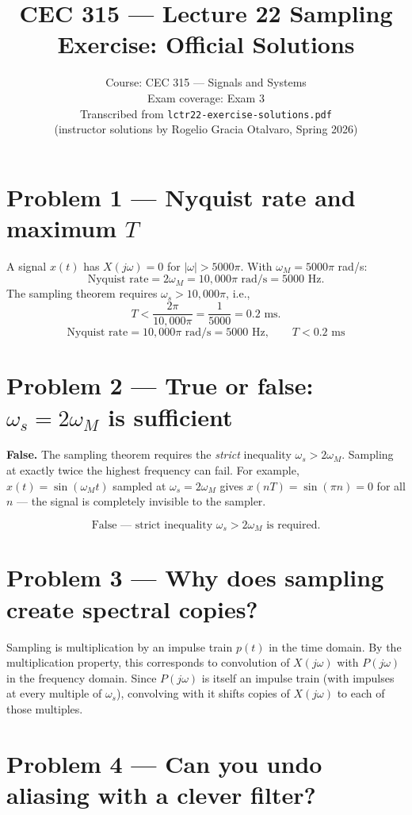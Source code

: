 \documentclass[11pt]{article}
\title{CEC 315 --- Lecture 22 Sampling Exercise: Official Solutions}
\author{Course: CEC 315 --- Signals and Systems \\
Exam coverage: Exam 3 \\
\small Transcribed from \texttt{lctr22-exercise-solutions.pdf} \\
\small (instructor solutions by Rogelio Gracia Otalvaro, Spring 2026)}
\date{}
\newcommand{\boxans}[1]{\[\boxed{#1}\]}
\begin{document}
\maketitle
\thispagestyle{fancy}

\section*{Problem 1 --- Nyquist rate and maximum \texorpdfstring{$T$}{T}}

A signal $x(t)$ has $X(j\omega) = 0$ for $|\omega| > 5000\pi$. With $\omega_M = 5000\pi$ rad/s:
\[
\text{Nyquist rate} = 2\omega_M = 10{,}000\pi \text{ rad/s} = 5000 \text{ Hz}.
\]
The sampling theorem requires $\omega_s > 10{,}000\pi$, i.e.,
\[
T < \frac{2\pi}{10{,}000\pi} = \frac{1}{5000} = 0.2 \text{ ms}.
\]
\boxans{\text{Nyquist rate} = 10{,}000\pi \text{ rad/s} = 5000 \text{ Hz}, \qquad T < 0.2 \text{ ms}}

\section*{Problem 2 --- True or false: \texorpdfstring{$\omega_s = 2\omega_M$}{omega\_s = 2 omega\_M} is sufficient}

\textbf{False.} The sampling theorem requires the \emph{strict} inequality $\omega_s > 2\omega_M$. Sampling at exactly twice the highest frequency can fail. For example, $x(t) = \sin(\omega_M t)$ sampled at $\omega_s = 2\omega_M$ gives $x(nT) = \sin(\pi n) = 0$ for all $n$ --- the signal is completely invisible to the sampler.

\boxans{\text{False --- strict inequality } \omega_s > 2\omega_M \text{ is required.}}

\section*{Problem 3 --- Why does sampling create spectral copies?}

Sampling is multiplication by an impulse train $p(t)$ in the time domain. By the multiplication property, this corresponds to convolution of $X(j\omega)$ with $P(j\omega)$ in the frequency domain. Since $P(j\omega)$ is itself an impulse train (with impulses at every multiple of $\omega_s$), convolving with it shifts copies of $X(j\omega)$ to each of those multiples.

\section*{Problem 4 --- Can you undo aliasing with a clever filter?}
\end{document}
